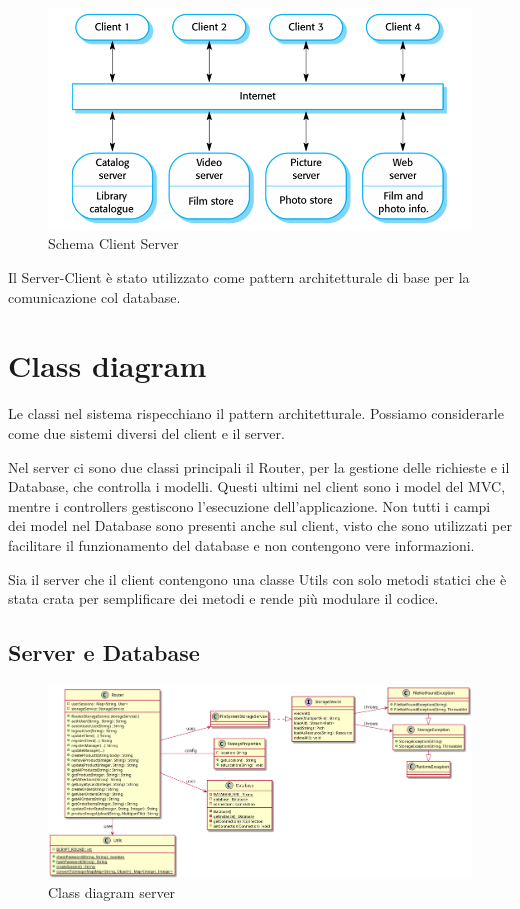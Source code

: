 \documentclass[12pt, a4paper]{report}
\begin{document}
\begin{figure}[H]
  \centering
  \includegraphics[width=\textwidth]{Client-Server.PNG}
  \caption{Schema Client Server}
\end{figure}
Il Server-Client è stato utilizzato come pattern architetturale di base per la comunicazione col database.


\section{Class diagram}

Le classi nel sistema rispecchiano il pattern architetturale. Possiamo
considerarle come due sistemi diversi del client e il server. 

Nel server ci sono due classi principali il Router, per la gestione delle richieste
e il Database, che controlla i modelli. Questi ultimi nel client sono i model del
MVC, mentre i controllers gestiscono l'esecuzione dell'applicazione. Non tutti i campi
dei model nel Database sono presenti anche sul client, visto che sono utilizzati
per facilitare il funzionamento del database e non contengono vere informazioni.

Sia il server che il client contengono una classe Utils con solo metodi statici
che è stata crata per semplificare dei metodi e rende più modulare il codice.


\subsection{Server e Database}

\begin{figure}[H]
  \centering
  \includegraphics[width=\textwidth]{router_class.png}
  \caption{Class diagram server}
\end{figure}
\end{document}
